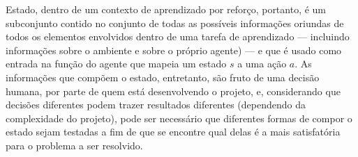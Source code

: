 \documentclass[cic,tc]{iiufrgs}
\begin{document}
    
    Estado, dentro de um contexto de aprendizado por reforço, portanto, é um subconjunto contido no conjunto de todas as possíveis informações oriundas
    de todos os elementos envolvidos dentro de uma tarefa de aprendizado  --- incluindo informações sobre o ambiente e sobre o próprio agente) --- e que é usado
    como entrada na função do agente que mapeia um estado $s$ a uma
    ação $a$. As informações que compõem o estado, entretanto, são fruto de uma decisão humana, por parte de quem está desenvolvendo o projeto, e,
    considerando que decisões diferentes podem trazer resultados diferentes (dependendo da complexidade do projeto), pode ser necessário
    que diferentes formas de compor o estado sejam testadas a fim de que se encontre qual delas é a mais satisfatória para o problema a ser resolvido.
    
\end{document}
